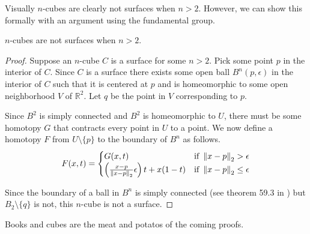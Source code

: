 Visually \(n\)-cubes are clearly not surfaces when \(n > 2\).
However, we can show this formally with an argument using the fundamental group.
\begin{thm}
\(n\)-cubes are not surfaces when \(n > 2\).
\end{thm}
\begin{proof}
    Suppose an \(n\)-cube \(C\) is a surface for some \(n > 2\).
    Pick some point \(p\) in the interior of \(C\).
    Since \(C\) is a surface there exists some open ball \(B^n(p, \epsilon)\) in the interior of \(C\) such that 
    it is centered at \(p\) and is homeomorphic to some open neighborhood \(V\) of \(\mathbb{R}^2\).
    Let \(q\) be the point in \(V\) corresponding to \(p\).
    
    

    Since \(B^2\) is simply connected and \(B^2\) is homeomorphic to \(U\), there must be some homotopy \(G\) that
    contracts every point in \(U\) to a point.
    We now define a homotopy \(F\) from \(U\setminus\{p\}\) to the boundary of \(B^n\) as follows.
    \[
        F(x,t) = \begin{cases}
        G(x,t) & \text{if } \left\lVert x-p\right\rVert_2 > \epsilon \\
        \left(\frac{x-p}{\left\lVert x-p\right\rVert_2}\epsilon\right)t + x(1 - t) & \text{if } \left\lVert x-p\right\rVert_2 \le \epsilon \\
        \end{cases}
    \]

    Since the boundary of a ball in \(B^n\) is simply connected (see theorem 59.3 in \cite{Munkres2000}) but \(B_2 \setminus \{q\}\) is not, this \(n\)-cube is not a surface.

\end{proof}

Books and cubes are the meat and potatos of the coming proofs.
